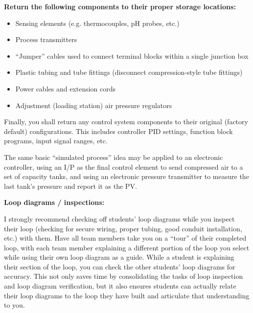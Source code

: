\vskip 10pt

\indent
{\bf Return the following components to their proper storage locations:}

\begin{itemize}
\item{} Sensing elements (e.g. thermocouples, pH probes, etc.)
\item{} Process transmitters
\item{} ``Jumper'' cables used to connect terminal blocks within a single junction box
\item{} Plastic tubing and tube fittings (disconnect compression-style tube fittings)
\item{} Power cables and extension cords
\item{} Adjustment (loading station) air pressure regulators
\end{itemize}

\vskip 10pt

Finally, you shall return any control system components to their original (factory default) configurations.  This includes controller PID settings, function block programs, input signal ranges, etc.
















The same basic ``simulated process'' idea may be applied to an electronic controller, using an I/P as the final control element to send compressed air to a set of capacity tanks, and using an electronic pressure transmitter to measure the last tank's pressure and report it as the PV.

\vskip 20pt

\noindent
{\bf Loop diagrams / inspections:}

I strongly recommend checking off students' loop diagrams while you inspect their loop (checking for secure wiring, proper tubing, good conduit installation, etc.) with them.  Have all team members take you on a ``tour'' of their completed loop, with each team member explaining a different portion of the loop you select while using their own loop diagram as a guide.  While a student is explaining their section of the loop, you can check the other students' loop diagrams for accuracy.  This not only saves time by consolidating the tasks of loop inspection and loop diagram verification, but it also ensures students can actually relate their loop diagrams to the loop they have built and articulate that understanding to you.




